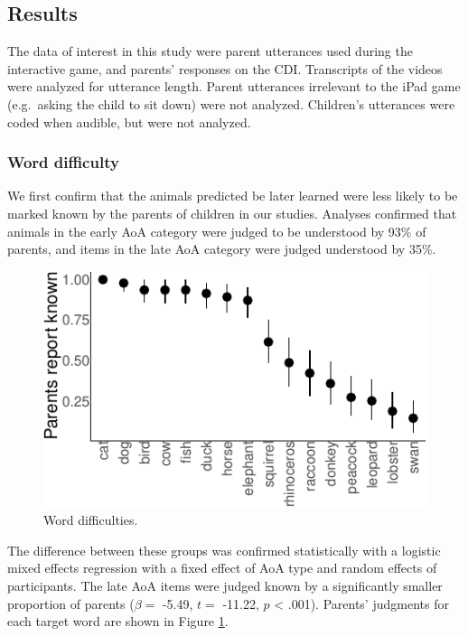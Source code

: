 \documentclass[10pt, letterpaper]{article}
\newenvironment{CodeChunk}{}{}
\begin{document}
\hypertarget{results}{%
\subsection{Results}\label{results}}

The data of interest in this study were parent utterances used during
the interactive game, and parents' responses on the CDI. Transcripts of
the videos were analyzed for utterance length. Parent utterances
irrelevant to the iPad game (e.g.~asking the child to sit down) were not
analyzed. Children's utterances were coded when audible, but were not
analyzed.

\hypertarget{word-difficulty}{%
\subsubsection{Word difficulty}\label{word-difficulty}}

We first confirm that the animals predicted be later learned were less
likely to be marked known by the parents of children in our studies.
Analyses confirmed that animals in the early AoA category were judged to
be understood by 93\% of parents, and items in the late AoA category
were judged understood by 35\%.

\begin{CodeChunk}
\begin{figure}[tb]
\includegraphics{figs/difficulty_fig-1} \caption[Word difficulties]{Word difficulties.}\label{fig:difficulty_fig}
\end{figure}
\end{CodeChunk}

The difference between these groups was confirmed statistically with a
logistic mixed effects regression with a fixed effect of AoA type and
random effects of participants. The late AoA items were judged known by
a significantly smaller proportion of parents (\(\beta =\) -5.49,
\(t =\) -11.22, \(p\) \textless{} .001). Parents' judgments for each
target word are shown in Figure \ref{fig:difficulty_fig}.
\end{document}
